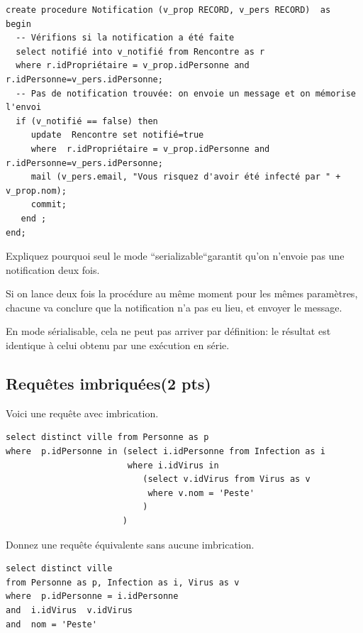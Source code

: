\begin{small}
\begin{verbatim}
create procedure Notification (v_prop RECORD, v_pers RECORD)  as 
begin
  -- Vérifions si la notification a été faite 
  select notifié into v_notifié from Rencontre as r
  where r.idPropriétaire = v_prop.idPersonne and r.idPersonne=v_pers.idPersonne;
  -- Pas de notification trouvée: on envoie un message et on mémorise l'envoi
  if (v_notifié == false) then
     update  Rencontre set notifié=true
     where  r.idPropriétaire = v_prop.idPersonne and r.idPersonne=v_pers.idPersonne;
     mail (v_pers.email, "Vous risquez d'avoir été infecté par " + v_prop.nom);
     commit;
   end ;
end;
\end{verbatim}
\end{small}

Expliquez pourquoi seul le mode ``serializable``garantit qu'on n'envoie pas une 
notification deux fois.



\begin{solution}
Si on lance deux fois la procédure au même moment pour les mêmes paramètres, 
chacune va conclure que la notification n'a pas eu lieu, et envoyer le message.

En mode sérialisable, cela ne peut pas arriver par définition: le résultat est identique
à celui obtenu par une exécution en série.
\end{solution}
\subsection*{Requêtes imbriquées(2 pts)}

Voici une requête avec imbrication.
\begin{small}
\begin{verbatim}
select distinct ville from Personne as p 
where  p.idPersonne in (select i.idPersonne from Infection as i
                        where i.idVirus in
                           (select v.idVirus from Virus as v
                            where v.nom = 'Peste'
                           )
                       )
\end{verbatim}               
\end{small}
Donnez une requête équivalente sans aucune imbrication.

\begin{solution}
\begin{verbatim}
select distinct ville 
from Personne as p, Infection as i, Virus as v
where  p.idPersonne = i.idPersonne 
and  i.idVirus  v.idVirus 
and  nom = 'Peste'
\end{verbatim}
\end{solution}


